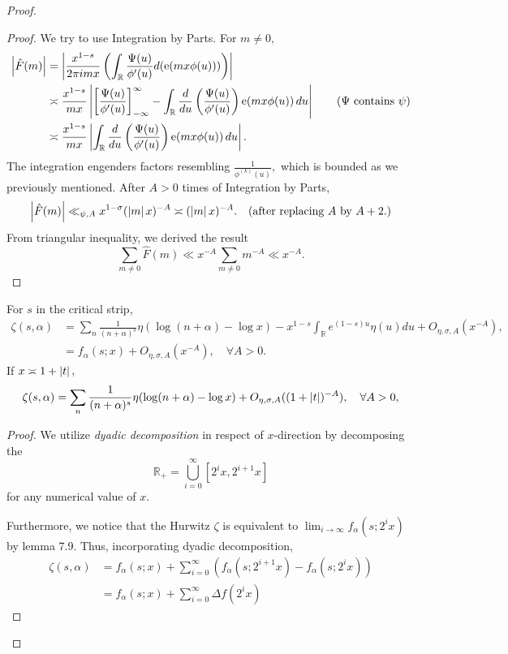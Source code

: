 \begin{proof}
\begin{proof}
We try to use Integration by Parts. For $m \neq 0,$
\begin{align*}
    \left\lvert \hat{F}(m) \right\rvert &= \left\lvert \frac{x^{1-s}}{2\pi imx} \left( \int_{\mathbb{R}} \frac{\Psi(u)}{\phi'(u)} d(\operatorname{e} \! \left( mx \phi(u) \right)) \right) \right\rvert \\
    &\asymp \frac{x^{1-s}}{mx} \left\lvert \left[ \frac{\Psi(u)}{\phi'(u)} \right]_{-\infty}^\infty - \int_{\mathbb{R}} \frac{d}{du} \left( \frac{\Psi(u)}{\phi'(u)} \right)\operatorname{e} \! \left( mx \phi(u) \right) du \right\rvert \qquad (\Psi \text{ contains } \psi)\\
    &\asymp \frac{x^{1-s}}{mx} \left\lvert \int_{\mathbb{R}} \frac{d}{du} \left( \frac{\Psi(u)}{\phi'(u)} \right)\operatorname{e} \! \left( mx \phi(u) \right) du \right\rvert.
\end{align*}
The integration engenders factors resembling $\frac{1}{\phi^{(k)}(u)},$ which is bounded as we previously mentioned. After $A > 0$ times of Integration by Parts,  
\begin{equation}
    \left\lvert \hat{F}(m) \right\rvert \ll_{\psi, A} x^{1-\sigma} (\left\lvert m \right\rvert x)^{-A} \asymp (\left\lvert m \right\rvert x)^{-A}. \quad (\text{after replacing $A$ by $A+2$.})
\end{equation}
From triangular inequality, we derived the result $$\sum_{m \neq 0} \hat{F}(m) \ll x^{-A} \sum_{m \neq 0} m^{-A} \ll x^{-A}.$$
\end{proof}

\begin{theorem}
    For $s$ in the critical strip,
    \begin{align*}
        \zeta(s, \alpha) &= \sum_n \frac{1}{(n+\alpha)^s} \eta(\log (n + \alpha) - \log x) - x^{1-s} \int_{\mathbb{R}} e^{(1-s)u} \eta(u) du + O_{\eta, \sigma, A}(x^{-A}), \\
        &= f_\alpha(s; x) + O_{\eta, \sigma, A}(x^{-A}), \quad \forall A > 0.
    \end{align*}
    If $x \asymp 1 + \left\lvert t \right\rvert,$
    \begin{equation}
        \zeta(s, \alpha) = \sum_n \frac{1}{(n+\alpha)^s} \eta(\log (n + \alpha) - \log x) + O_{\eta, \sigma, A}((1+\left\lvert t \right\rvert)^{-A}), \quad \forall A > 0,
    \end{equation}
\end{theorem}
\begin{proof}
We utilize \emph{dyadic decomposition} in respect of $x$-direction by decomposing the $$\mathbb{R}_+ = \bigcup_{i = 0}^\infty [2^ix, 2^{i+1}x]$$ for any numerical value of $x.$ 

Furthermore, we notice that the Hurwitz $\zeta$ is equivalent to $\lim_{i \to \infty} f_\alpha(s; 2^ix)$ by lemma 7.9. Thus, incorporating dyadic decomposition, 
\begin{align*}
    \zeta(s, \alpha) &= f_\alpha(s; x) + \sum_{i = 0}^\infty \left( f_\alpha(s; 2^{i+1}x) - f_\alpha(s; 2^ix) \right)  \\
    &= f_\alpha(s; x) + \sum_{i = 0}^\infty \Delta f(2^ix)
\end{align*}


\end{proof}
\end{proof}
